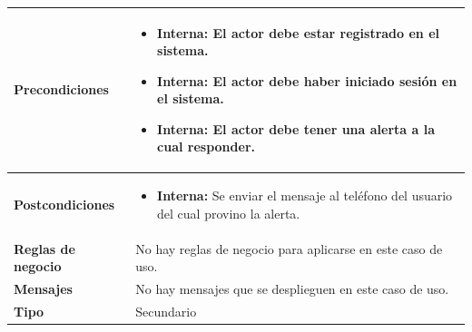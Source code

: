 \begin{center}
\begin{longtable}{| p{3.5cm} | p{11.5cm} |}
        \hline  
          \textbf{Precondiciones} & 
		\begin{itemize}
	              \item \textbf{Interna:} El actor debe estar registrado en el sistema.
	              \item \textbf{Interna:} El actor debe haber iniciado sesión en el sistema.
	              \item \textbf{Interna:} El actor debe tener una alerta a la cual responder.
	            \end{itemize} \\
        \hline  
          \textbf{Postcondiciones} & 
		\begin{itemize}
	              \item \textbf{Interna:} Se enviar el mensaje al teléfono del usuario del cual provino la alerta.
	            \end{itemize} \\
        \hline
          \textbf{Reglas de negocio} & No hay reglas de negocio para aplicarse en este caso de uso. \\
        \hline
          \textbf{Mensajes} & No hay mensajes que se desplieguen en este caso de uso. \\
        \hline
          \textbf{Tipo} & Secundario\\
        \hline      
  \end{longtable}
\end{center}
\endgroup

